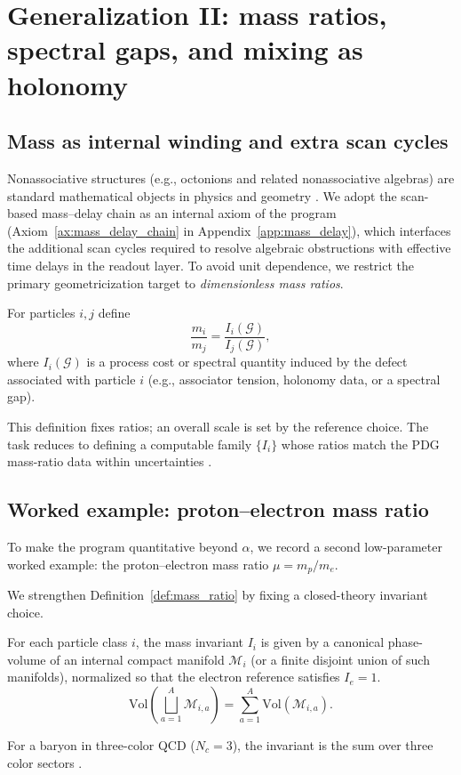 \section{Generalization II: mass ratios, spectral gaps, and mixing as holonomy}
\label{sec:masses_mixing}

\subsection{Mass as internal winding and extra scan cycles}
Nonassociative structures (e.g., octonions and related nonassociative algebras) are standard mathematical objects in physics and geometry \cite{Baez2002Octonions,Okubo1995Nonassociative,Schafer1966Nonassociative}. We adopt the scan-based mass--delay chain as an internal axiom of the program (Axiom~\ref{ax:mass_delay_chain} in Appendix~\ref{app:mass_delay}), which interfaces the additional scan cycles required to resolve algebraic obstructions with effective time delays in the readout layer. To avoid unit dependence, we restrict the primary geometricization target to \emph{dimensionless mass ratios}.

\begin{definition}
\label{def:mass_ratio}
For particles $i,j$ define
\begin{equation}
\frac{m_i}{m_j}=\frac{I_i(\mathcal{G})}{I_j(\mathcal{G})},
\end{equation}
where $I_i(\mathcal{G})$ is a process cost or spectral quantity induced by the defect associated with particle $i$ (e.g., associator tension, holonomy data, or a spectral gap).
\end{definition}

This definition fixes ratios; an overall scale is set by the reference choice. The task reduces to defining a computable family $\{I_i\}$ whose ratios match the PDG mass-ratio data within uncertainties \cite{PDGRPP2024}.

\subsection{Worked example: proton--electron mass ratio}
To make the program quantitative beyond $\alpha$, we record a second low-parameter worked example: the proton--electron mass ratio $\mu=m_p/m_e$.

We strengthen Definition~\ref{def:mass_ratio} by fixing a closed-theory invariant choice.

\begin{axiom}\label{ax:mass_volume}
For each particle class $i$, the mass invariant $I_i$ is given by a canonical phase-volume of an internal compact manifold $\mathcal{M}_i$ (or a finite disjoint union of such manifolds), normalized so that the electron reference satisfies $I_e=1$.
\begin{equation}
\mathrm{Vol}\!\left(\bigsqcup_{a=1}^A \mathcal{M}_{i,a}\right)=\sum_{a=1}^A \mathrm{Vol}(\mathcal{M}_{i,a}).
\end{equation}

For a baryon in three-color QCD ($N_c=3$), the invariant is the sum over three color sectors \cite{PeskinSchroeder1995,PDGRPP2024}.
\end{axiom}

